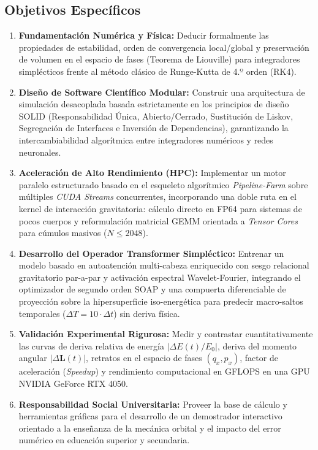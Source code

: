 \documentclass[11pt,a4paper]{article}
\begin{document}
\subsection{Objetivos Específicos}
\begin{enumerate}
    \item \textbf{Fundamentación Numérica y Física:} Deducir formalmente las propiedades de estabilidad, orden de convergencia local/global y preservación de volumen en el espacio de fases (Teorema de Liouville) para integradores simplécticos frente al método clásico de Runge-Kutta de 4.º orden (RK4).
    \item \textbf{Diseño de Software Científico Modular:} Construir una arquitectura de simulación desacoplada basada estrictamente en los principios de diseño SOLID (Responsabilidad Única, Abierto/Cerrado, Sustitución de Liskov, Segregación de Interfaces e Inversión de Dependencias), garantizando la intercambiabilidad algorítmica entre integradores numéricos y redes neuronales.
    \item \textbf{Aceleración de Alto Rendimiento (HPC):} Implementar un motor paralelo estructurado basado en el esqueleto algorítmico \textit{Pipeline-Farm} sobre múltiples \textit{CUDA Streams} concurrentes, incorporando una doble ruta en el kernel de interacción gravitatoria: cálculo directo en FP64 para sistemas de pocos cuerpos y reformulación matricial GEMM orientada a \textit{Tensor Cores} para cúmulos masivos ($N \le 2048$).
    \item \textbf{Desarrollo del Operador Transformer Simpléctico:} Entrenar un modelo basado en autoatención multi-cabeza enriquecido con sesgo relacional gravitatorio par-a-par y activación espectral Wavelet-Fourier, integrando el optimizador de segundo orden SOAP y una compuerta diferenciable de proyección sobre la hipersuperficie iso-energética para predecir macro-saltos temporales ($\Delta T = 10\cdot\Delta t$) sin deriva física.
    \item \textbf{Validación Experimental Rigurosa:} Medir y contrastar cuantitativamente las curvas de deriva relativa de energía $|\Delta E(t) / E_0|$, deriva del momento angular $|\Delta \mathbf{L}(t)|$, retratos en el espacio de fases $(q_x, p_x)$, factor de aceleración (\textit{Speedup}) y rendimiento computacional en GFLOPS en una GPU NVIDIA GeForce RTX 4050.
    \item \textbf{Responsabilidad Social Universitaria:} Proveer la base de cálculo y herramientas gráficas para el desarrollo de un demostrador interactivo orientado a la enseñanza de la mecánica orbital y el impacto del error numérico en educación superior y secundaria.
\end{enumerate}
\end{document}

